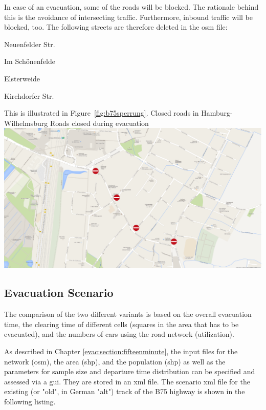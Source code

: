 In case of an evacuation, some of the roads will be blocked. The rationale behind this is the avoidance of intersecting traffic. Furthermore, inbound traffic will be blocked, too. The following streets are therefore deleted in the \gls{osm} file:
%
\begin{compactitem}
	\item Neuenfelder Str. 
	\item Im Schönenfelde
	\item Elsterweide
	\item Kirchdorfer Str.
\end{compactitem}
%
This is illustrated in Figure~\ref{fig:b75sperrung}.
%
%
\createfigure%
{Closed roads in Hamburg-Wilhelmsburg}%
{Roads closed during evacuation}%
{\label{fig:b75sperrung}}%
{\includegraphics[width=0.7\linewidth]{using/figures/B75sperrung}}%
{}

\subsection{Evacuation Scenario}
The comparison of the two different variants is based on the overall evacuation time, the clearing time of different cells (squares in the area that has to be evacuated), and the numbers of cars using the road network (utilization).

As described in Chapter \ref{evac:section:fifteenminute}, the input files for the network (\gls{osm}), the area (shp), and the population (shp) as well as the parameters for sample size and departure time distribution can be specified and assessed via a \gls{gui}. They are stored in an \gls{xml} file. The scenario \gls{xml} file for the existing (or "old", in German "alt") track of the B75 highway is shown in the following listing. 




